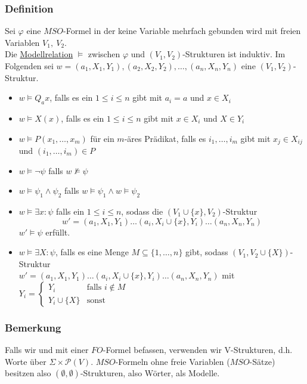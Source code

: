         \subsubsection{Definition}
            Sei $\varphi$ eine $MSO$-Formel in der keine Variable mehrfach gebunden wird mit freien Variablen $V_1,\ V_2$.\\
            Die \underline{Modellrelation} $\models$ zwischen $\varphi$ und $\left(V_1,V_2\right)$-Strukturen ist induktiv. Im Folgenden sei $w=\left(a_1,X_1,Y_1\right),\left(a_2,X_2,Y_2\right),\dots,\left(a_n,X_n,Y_n\right)$ eine $\left(V_1,V_2\right)$-Struktur.
            \begin{itemize}
                \item $w\models Q_ax$, falls es ein $1\le i\le n$ gibt mit $a_i=a$ und $x\in X_i$
                \item $w\models X(x)$, falls es ein $1\le i\le n$ gibt mit $x\in X_i$ und $X\in Y_i$
                \item $w\models P(x_1,\dots,x_m)$ für ein $m$-äres Prädikat, falls es $i_1,\dots,i_m$ gibt mit $x_j\in X_{ij}$ und $(i_1,\dots,i_m)\in P$
                \item $w\models\neg\psi$ falls $w\not\models\psi$
                \item $w\models\psi_1\wedge\psi_2$ falls $w\models\psi_1\wedge w\models\psi_2$
                \item $w\models\exists x:\psi$ falls ein $1\le i\le n$, sodass die $(V_1\cup \{x\},V_2)$-Struktur $$w'=(a_1,X_1,Y_1)\dots (a_i,X_i\cup\{x\},Y_i)\dots(a_n,X_n,Y_n)$$ $w'\models\psi$ erfüllt.
                \item $w\models\exists X:\psi$, falls es eine Menge $M\subseteq\{1,\dots,n\}$ gibt, sodass $(V_1,V_2\cup\{X\})$-Struktur\\$w'=(a_1,X_1,Y_1)\dots (a_i,X_i\cup\{x\},Y_i)\dots(a_n,X_n,Y_n)$ mit $Y_i=\begin{cases}
                    Y_i & \text{falls }i\not\in M\\
                    Y_i\cup\{X\} & \text{sonst}
                \end{cases}$
            \end{itemize}
        \subsubsection{Bemerkung}
            Falls wir und mit einer $FO$-Formel befassen, verwenden wir V-Strukturen, d.h. Worte über $\Sigma\times\mathcal{P}(V)$. $MSO$-Formeln ohne freie Variablen ($MSO$-Sätze) besitzen also $(\emptyset,\emptyset)$-Strukturen, also Wörter, als Modelle.
